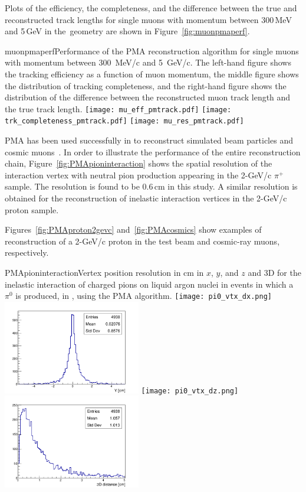 Plots of the efficiency, the completeness, and the  difference between the true and reconstructed
track lengths for single muons with momentum between 300\,MeV and 5\,GeV in the~\pdsp geometry are
shown in Figure~\ref{fig:muonpmaperf}.  

\begin{cdrfigure}{muonpmaperf}{Performance of the PMA reconstruction algorithm for single muons with 
momentum between 300~MeV/c and 5~GeV/c.  The left-hand figure shows the tracking efficiency as a function of
muon momentum, the middle figure shows the distribution of tracking completeness, and the right-hand figure shows the
distribution of the difference between the reconstructed muon track length and the true track length.}
\texttt{[image: mu\_eff\_pmtrack.pdf]}
\texttt{[image: trk\_completeness\_pmtrack.pdf]}
\texttt{[image: mu\_res\_pmtrack.pdf]}
\end{cdrfigure}

PMA has been used successfully in \pdsp to reconstruct simulated beam particles and cosmic muons~\cite{pma_cosmic_mu}. In order to illustrate the performance of the entire reconstruction chain,
Figure~\ref{fig:PMApioninteraction} shows the spatial resolution of the interaction vertex with neutral pion
production appearing in the 2-GeV/c $\pi^+$ sample.
The resolution is found to be 0.6\,cm in this study.
A similar resolution is obtained for the reconstruction
of inelastic interaction vertices in the 2-GeV/c proton sample. 


Figures~\ref{fig:PMAproton2gevc}
and~\ref{fig:PMAcosmics} show examples of reconstruction of a 2-GeV/c proton in the test beam and
cosmic-ray muons, respectively.

\begin{cdrfigure}{PMApioninteraction}{Vertex position resolution in cm in $x$, $y$, and $z$ and 3D for the
  inelastic interaction of charged pions on liquid argon nuclei in events in which a $\pi^0$ is produced, in
  \pdsp, using the PMA algorithm.}
\texttt{[image: pi0\_vtx\_dx.png]}\includegraphics[width=0.45\textwidth]{figures/pi0_vtx_dy.png}
\texttt{[image: pi0\_vtx\_dz.png]}\includegraphics[width=0.45\textwidth]{figures/pi0_vtx3d.png}
\end{cdrfigure}


